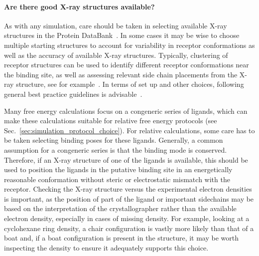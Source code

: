 \documentclass[9pt,bestpractices,pubversion]{livecoms}
\begin{document}
\paragraph{Are there good X-ray structures available?}
As with any simulation, care should be taken in selecting available X-ray structures in the Protein DataBank~\cite{berman2003announcing}. In some cases it may be wise to choose multiple starting structures to account for variability in receptor conformations as well as the accuracy of available X-ray structures. Typically, clustering of receptor structures can be used to identify different receptor conformations near the binding site, as well as assessing relevant side chain placements from the X-ray structure, see for example~\cite{mey2016blinded}. In terms of set up and other choices, following general best practice guidelines is advisable~\cite{braun2019best}.

Many free energy calculations focus on a congeneric series of ligands, which can make these calculations suitable for relative free energy protocols (see Sec.~\ref{sec:simulation_protocol_choice}). For relative calculations, some care has to be taken selecting binding poses for these ligands. Generally, a common assumption for a congeneric series is that the binding mode is conserved. Therefore, if an X-ray structure of one of the ligands is available, this should be used to position the ligands in the putative binding site in an energetically reasonable conformation without steric or electrostatic mismatch with the receptor. Checking the X-ray structure versus the experimental electron densities is important, as the position of part of the ligand or important sidechains may be based on the interpretation of the crystallographer rather than the available electron density, especially in cases of missing density. For example, looking at a cyclohexane ring density, a chair configuration is vastly more likely than that of a boat and, if a boat configuration is present in the structure, it may be worth inspecting the density to ensure it adequately supports this choice. 
\end{document}
